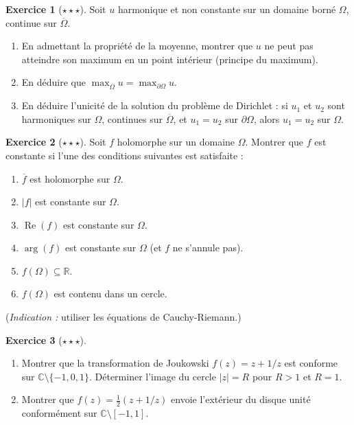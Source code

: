 \documentclass[12pt,a4paper,openany]{book}
\theoremstyle{definition}
\newtheorem{exercice}{Exercice}[chapter]
\theoremstyle{plain}
\theoremstyle{remark}
\newcommand{\C}{\mathbb{C}}
\newcommand{\R}{\mathbb{R}}
\DeclareMathOperator{\re}{Re}
\newcommand{\abs}[1]{\left|#1\right|}
\newcommand{\conj}[1]{\overline{#1}}
\begin{document}
\begin{exercice}[$\star\star\star$]\label{exo:principe-maximum-harmonique}
Soit $u$ harmonique et non constante sur un domaine borné $\Omega$, continue sur $\conj{\Omega}$.
\begin{enumerate}[label=(\alph*)]
  \item En admettant la propriété de la moyenne, montrer que $u$ ne peut pas atteindre son maximum en un point intérieur (principe du maximum).
  \item En déduire que $\max_{\conj{\Omega}} u = \max_{\partial\Omega} u$.
  \item En déduire l'unicité de la solution du problème de Dirichlet : si $u_1$ et $u_2$ sont harmoniques sur $\Omega$, continues sur $\conj{\Omega}$, et $u_1 = u_2$ sur $\partial\Omega$, alors $u_1 = u_2$ sur $\Omega$.
\end{enumerate}
\end{exercice}

\begin{exercice}[$\star\star\star$]\label{exo:holomorphe-constante}
Soit $f$ holomorphe sur un domaine $\Omega$. Montrer que $f$ est constante si l'une des conditions suivantes est satisfaite :
\begin{enumerate}[label=(\alph*)]
  \item $\conj{f}$ est holomorphe sur $\Omega$.
  \item $\abs{f}$ est constante sur $\Omega$.
  \item $\re(f)$ est constante sur $\Omega$.
  \item $\arg(f)$ est constante sur $\Omega$ (et $f$ ne s'annule pas).
  \item $f(\Omega) \subseteq \R$.
  \item $f(\Omega)$ est contenu dans un cercle.
\end{enumerate}
(\emph{Indication :} utiliser les équations de Cauchy-Riemann.)
\end{exercice}

\begin{exercice}[$\star\star\star$]\label{exo:conforme-applications}
\begin{enumerate}[label=(\alph*)]
  \item Montrer que la transformation de Joukowski $f(z) = z + 1/z$ est conforme sur $\C \setminus \{-1, 0, 1\}$. Déterminer l'image du cercle $\abs{z} = R$ pour $R > 1$ et $R = 1$.
  \item Montrer que $f(z) = \frac{1}{2}(z + 1/z)$ envoie l'extérieur du disque unité conformément sur $\C \setminus [-1,1]$.
\end{enumerate}
\end{exercice}
\end{document}
